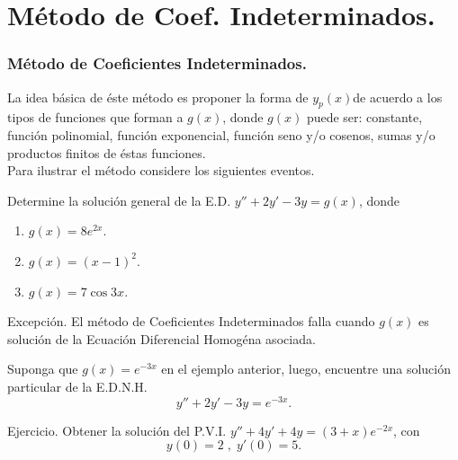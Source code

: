 \documentclass{beamer}
\begin{document}
\section{Método de Coef. Indeterminados.} %
\begin{frame}[t]
	\frametitle{Método de Coeficientes Indeterminados.}
	\vspace{-5mm}
	\begin{block}{}
		La idea básica de éste método es proponer la forma de \(y_p(x)\)de acuerdo a los tipos de funciones que forman a \(g(x)\), donde \(g(x)\) puede ser: constante, función polinomial, función exponencial, función seno y/o cosenos, sumas y/o productos finitos de éstas funciones. \\[2mm]
		Para ilustrar el método considere los siguientes eventos.
	\end{block}
	\begin{example}
		Determine la solución general de la E.D. \(y'' + 2y' -3y=g(x)\), donde
		\begin{enumerate}
			\item \(g(x) = 8e^{2x}\).
			\item \(g(x) = (x-1) ^2\).
			\item \(g(x) = 7 \cos 3x\).
		\end{enumerate}
	\end{example}
\end{frame}
\begin{frame}[t]
\end{frame}

\begin{frame}[t]
	\begin{block}{Excepción.}
		El método de Coeficientes Indeterminados falla cuando \(g(x)\) es solución de la Ecuación Diferencial Homogéna asociada.
	\end{block}
	\begin{example}
		Suponga que \(g(x) =e^{-3x}\) en el ejemplo anterior, luego, encuentre una solución particular de la E.D.N.H.
		\[
			y'' +2y' -3y=e^{-3x}.
		\]
	\end{example}
\end{frame}
\begin{frame}[t]
\end{frame}

\begin{frame}[t]
	\begin{alertblock}{Ejercicio.}
		Obtener la solución del P.V.I. \(y'' +4y' +4y=(3+x) e^{-2x}\), con
		\[
			y(0) = 2 \;,\; y' (0) =5.
		\]
	\end{alertblock}
\end{frame}
\end{document}
